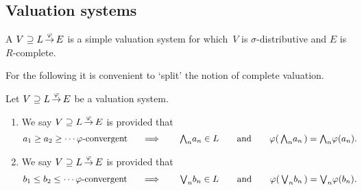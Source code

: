 \documentclass[main.tex]{subfiles}
\begin{document}
\subsection{Valuation systems}
\begin{dfn}
\label{D:system}
A  $V \supseteq L\,\smash{\stackrel{\varphi}{\rightarrow}}\,E$
is a simple valuation system
for which~$V$ is $\sigma$-distributive
and $E$ is $R$-complete.
\end{dfn}

For the following it is convenient to `split' the notion
of complete valuation.
\begin{dfn}
\label{D:system-complete2}
Let $V \supseteq L\,\smash{\stackrel{\varphi}{\rightarrow}}\,E$ be
a valuation system.
\begin{enumerate}
\item
\label{D:system-complete2-pi}
We say $V \supseteq L\,\smash{\stackrel{\varphi}{\rightarrow}}\,E$ is 
provided that
\begin{alignat*}{5}
a_1 \geq a_2 \geq \dotsb \text{$\varphi$-convergent }
  \quad &\implies \quad 
  & \textstyle{\bigwedge}_n a_n &\in L\quad 
  &&\text{and}\quad
  &\varphi(\,\textstyle{\bigwedge}_n a_n\,) &= \textstyle{\bigwedge}_n \varphi(a_n). 
\end{alignat*}
\item
We say $V \supseteq L\,\smash{\stackrel{\varphi}{\rightarrow}}\,E$ is 
provided that
\begin{alignat*}{5}
b_1 \leq b_2 \leq \dotsb \text{$\varphi$-convergent }
  \quad &\implies \quad 
  & \textstyle{\bigvee}_n b_n &\in L\quad 
  &&\text{and}\quad
  &\varphi(\,\textstyle{\bigvee}_n b_n\,) &= \textstyle{\bigvee}_n \varphi(b_n). 
\end{alignat*}

\end{enumerate}
\end{dfn}
\end{document}

